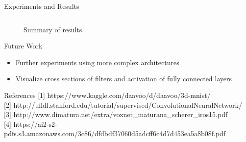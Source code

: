 \documentclass[final]{beamer}
\begin{document}
\begin{frame}{}
\begin{textblock}{25}
\begin{block}{Experiments and Results}
\begin{figure}
\begin{center}
\begin{tabular}{|l|l|}
\hline
\end{tabular}
\end{center}
\caption{Summary of results.}
\label{results}
\end{figure}
\end{block}
\begin{block}{Future Work}
\begin{itemize}
\item\text{ }Further experiments using more complex architectures
\item\text{ }Visualize cross sections of filters and activation of fully connected layers
\end{itemize}
\end{block}

\begin{block}{References}
\footnotesize
[1] https://www.kaggle.com/daavoo/d/daavoo/3d-mnist/\\

[2] http://ufldl.stanford.edu/tutorial/supervised/ConvolutionalNeuralNetwork/\\

[3] http://www.dimatura.net/extra/voxnet\_maturana\_scherer\_iros15.pdf\\

[4] https://ai2-s2-pdfs.s3.amazonaws.com/3c86/dfdbdf37060d5adcff6c4d7d453ea5a8b08f.pdf
\end{block}
\end{textblock}

\end{frame}
\end{document}
